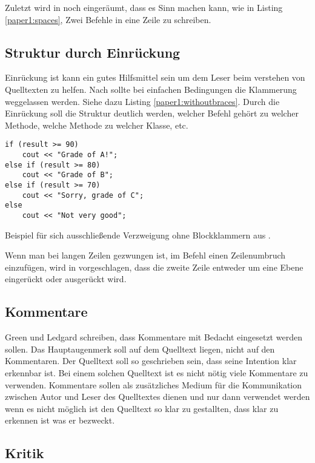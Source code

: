 Zuletzt wird in \cite{Green} noch eingeräumt, dass es Sinn machen kann, wie in Listing \ref{paper1:spaces}, Zwei Befehle in eine Zeile zu schreiben.

\subsection{Struktur durch Einrückung}
Einrückung ist kann ein gutes Hilfsmittel sein um dem Leser beim verstehen von Quelltexten zu helfen. Nach \cite[S. 8]{Green} sollte bei einfachen Bedingungen die Klammerung weggelassen werden. Siehe dazu Listing \ref{paper1:withoutbraces}. Durch die Einrückung soll die Struktur deutlich werden, welcher Befehl gehört zu welcher Methode, welche Methode zu welcher Klasse, etc.

\begin{listing}[H]
    \begin{verbatim}
if (result >= 90)
    cout << "Grade of A!";
else if (result >= 80)
    cout << "Grade of B";
else if (result >= 70)
    cout << "Sorry, grade of C";
else
    cout << "Not very good";
    \end{verbatim}
    \label{paper1:withoutbraces}
    \caption{Beispiel für sich ausschließende Verzweigung ohne Blockklammern aus \cite[S. 8]{Green}.}
\end{listing}

Wenn man bei langen Zeilen gezwungen ist, im Befehl einen Zeilenumbruch einzufügen, wird in \cite[S. 3]{Green} vorgeschlagen, dass die zweite Zeile entweder um eine Ebene eingerückt oder ausgerückt wird.

\subsection{Kommentare}
Green und Ledgard schreiben, dass Kommentare mit Bedacht eingesetzt werden sollen. Das Hauptaugenmerk soll auf dem Quelltext liegen, nicht auf den Kommentaren. Der Quelltext soll so geschrieben sein, dass seine Intention klar erkennbar ist. Bei einem solchen Quelltext ist es nicht nötig viele Kommentare zu verwenden. Kommentare sollen als zusätzliches Medium für die Kommunikation zwischen Autor und Leser des Quelltextes dienen und nur dann verwendet werden wenn es nicht möglich ist den Quelltext so klar zu gestallten, dass klar zu erkennen ist was er bezweckt. \cite[S. 9]{Green}


\subsection{Kritik}

